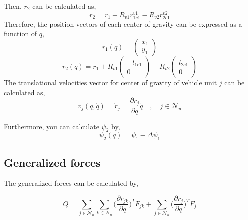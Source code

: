\documentclass[12pt]{article}
\begin{document}
Then, $r_2$ can be calculated as,
\begin{equation}
    r_2 = r_1 + R_{v1} r_{1c1}^{v1} - R_{v2} r_{2c1}^{v2} 
\end{equation}
Therefore, the position vectors of each center of gravity can be expressed as a function of $q$,
\begin{equation}
    r_1 (q) = \begin{pmatrix} x_1 \\ y_1 \end{pmatrix}
\end{equation}
\begin{equation}
    r_2 (q) = r_1 + R_{v1} \begin{pmatrix} - l_{1c1} \\ 0 \end{pmatrix} - R_{v2} \begin{pmatrix} l_{2c1} \\ 0 \end{pmatrix} 
\end{equation}
The translational velocities vector for center of gravity of vehicle unit $j$ can be calculated as, 
\begin{equation}
    v_j (q,\dot{q}) = \dot{r}_j = \frac{\partial r_j}{\partial q}\dot{q} \quad , \quad j \in \mathcal{N}_u
\end{equation}

Furthermore, you can calculate $\psi_2$ by,
\begin{equation}
    \psi _2 (q)= \psi _1 - \Delta \psi_1
\end{equation}

\subsection{Generalized forces}
The generalized forces can be calculated by,

\begin{equation}\label{Generalized_forces_general_eq}
    Q = \sum_{j \in \mathcal{N}_u} \sum_{k \in \mathcal{N}_a} \Big( \frac{\partial r_{jk}}{\partial q} \Big)^T F_{jk} + \sum_{j \in \mathcal{N}_u} \Big( \frac{\partial r_{j}}{\partial q} \Big)^T F_j 
\end{equation}
\end{document}
